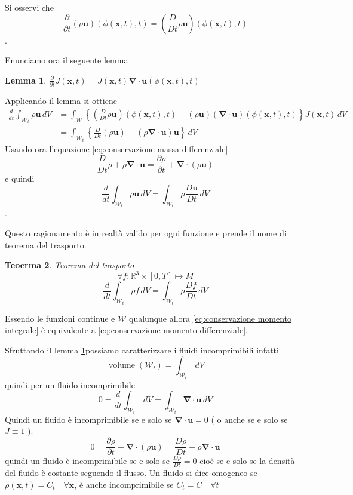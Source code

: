 \documentclass{book}
\newtheorem{theorem}{Teoerma}[section]
\newtheorem{lemma}[theorem]{Lemma}
\newenvironment{proof}[1][Dimostrazione]{\begin{trivlist}
\item[\hskip \labelsep {\bfseries #1}]}{\end{trivlist}}
\newcommand{\Nabla}{\boldsymbol{\nabla}}
\DeclareMathOperator{\volume}{volume}
\begin{document}
Si osservi che $$\frac{\partial}{\partial t} (\rho \mathbf{u})(\phi(\mathbf{x},t),t) = \left(\frac{D}{D t} \rho \mathbf{u}\right)(\phi(\mathbf{x},t),t) $$.

Enunciamo ora il seguente lemma
\begin{lemma}\label{lemma:incomprimibile}
$\frac{\partial}{\partial t}  J(\mathbf{x},t) = J(\mathbf{x},t) \Nabla \cdot \mathbf{u} (\phi(\mathbf{x},t),t)$  
\end{lemma}
\begin{proof}
[...]
\end{proof}

Applicando il lemma si ottiene
\begin{equation*}
\begin{split}
\frac{d}{dt}\int_{\mathcal{W}_t}\rho\mathbf{u}\, dV &= \int_{\mathcal{W}} \left \{ \left ( \frac{D}{Dt}\rho\mathbf{u} \right )(\phi(\mathbf{x},t),t)+(\rho\mathbf{u})(\Nabla\cdot\mathbf{u})(\phi(\mathbf{x},t),t) \right \} J(\mathbf{x},t)\, dV\\
&=\int_{\mathcal{W}_t}\left \{ \frac{D}{Dt}(\rho\mathbf{u})+(\rho\Nabla\cdot\mathbf{u})\mathbf{u}\right \}\,dV
\end{split}
\end{equation*}
Usando ora l'equazione \ref{eq:conservazione massa differenziale}
$$\frac{D}{Dt}\rho+\rho\Nabla\cdot\mathbf{u}=\frac{\partial\rho}{\partial t}+\Nabla\cdot(\rho\mathbf{u})$$
e quindi
$$\frac{d}{dt}\int_{\mathcal{W}_t}\rho\mathbf{u}\, dV = \int_{\mathcal{W}_t}\rho\frac{D\mathbf{u}}{Dt}\, dV$$.

Questo ragionamento è in realtà valido per ogni funzione e prende il nome di teorema del trasporto.
\begin{theorem}{Teorema del trasporto}
$$ \forall f:\mathbb{R}^3\times[0,T]\mapsto M $$ $$\frac{d}{dt}\int_{\mathcal{W}_t}\rho f\, dV = \int_{\mathcal{W}_t}\rho\frac{Df}{Dt}\,dV$$
\end{theorem}

Essendo le funzioni continue e $\mathcal{W}$ qualunque allora \ref{eq:conservazione momento integrale} è equivalente a \ref{eq:conservazione momento differenziale}.

Sfruttando il lemma \ref{lemma:incomprimibile}possiamo caratterizzare i fluidi incomprimibili infatti
$$\volume(\mathcal{W}_t) = \int_{\mathcal{W}_t} \, dV$$
quindi per un fluido incomprimibile
$$0 = \frac{d}{dt} \int_{\mathcal{W}_t} \, dV  = \int_{\mathcal{W}_t} \Nabla \cdot \mathbf{u} \, dV$$
Quindi un fluido è incomprimibile se e solo se $\Nabla \cdot \mathbf{u}=0$ ( o anche se e solo se $J \equiv 1$ ).
$$0 = \frac{\partial \rho}{\partial t} + \Nabla\cdot(\rho \mathbf{u}) = \frac{D\rho}{Dt} + \rho\Nabla\cdot \mathbf{u}$$
quindi un fluido è incomprimibile se e solo se $\frac{D \rho}{Dt} = 0$ cioè se e solo se la densità del fluido è costante seguendo il flusso.
Un fluido si dice omogeneo se $\rho(\mathbf{x},t)=C_t \quad \forall \mathbf{x}$, è anche incomprimibile se $C_t=C \quad \forall t$
\end{document}

